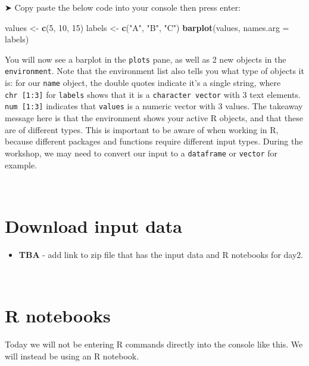 \documentclass[
]{book}
\newenvironment{Shaded}{\begin{snugshade}}{\end{snugshade}}
\newcommand{\AttributeTok}[1]{\textcolor[rgb]{0.13,0.29,0.53}{#1}}
\newcommand{\DecValTok}[1]{\textcolor[rgb]{0.00,0.00,0.81}{#1}}
\newcommand{\FunctionTok}[1]{\textcolor[rgb]{0.13,0.29,0.53}{\textbf{#1}}}
\newcommand{\NormalTok}[1]{#1}
\newcommand{\OtherTok}[1]{\textcolor[rgb]{0.56,0.35,0.01}{#1}}
\newcommand{\StringTok}[1]{\textcolor[rgb]{0.31,0.60,0.02}{#1}}
\providecommand{\tightlist}{%
  \setlength{\itemsep}{0pt}\setlength{\parskip}{0pt}}
\begin{document}
➤ Copy paste the below code into your console then press enter:

\begin{Shaded}
\begin{Highlighting}[]
\NormalTok{values }\OtherTok{\textless{}{-}} \FunctionTok{c}\NormalTok{(}\DecValTok{5}\NormalTok{, }\DecValTok{10}\NormalTok{, }\DecValTok{15}\NormalTok{)}
\NormalTok{labels }\OtherTok{\textless{}{-}} \FunctionTok{c}\NormalTok{(}\StringTok{"A"}\NormalTok{, }\StringTok{"B"}\NormalTok{, }\StringTok{"C"}\NormalTok{)}
\FunctionTok{barplot}\NormalTok{(values, }\AttributeTok{names.arg =}\NormalTok{ labels)}
\end{Highlighting}
\end{Shaded}

You will now see a barplot in the \texttt{plots} pane, as well as 2 new objects in the \texttt{environment}. Note that the environment list also tells you what type of objects it is: for our \texttt{name} object, the double quotes indicate it's a single string, where \texttt{chr\ {[}1:3{]}} for \texttt{labels} shows that it is a \texttt{character\ vector} with 3 text elements. \texttt{num\ {[}1:3{]}} indicates that \texttt{values} is a numeric vector with 3 values. The takeaway message here is that the environment shows your active R objects, and that these are of different types. This is important to be aware of when working in R, because different packages and functions require different input types. During the workshop, we may need to convert our input to a \texttt{dataframe} or \texttt{vector} for example.

~

\hypertarget{download-input-data}{%
\section{Download input data}\label{download-input-data}}

\begin{itemize}
\tightlist
\item
  \textbf{TBA} - add link to zip file that has the input data and R notebooks for day2.
\end{itemize}

~

\hypertarget{r-notebooks}{%
\section{R notebooks}\label{r-notebooks}}

Today we will not be entering R commands directly into the console like this. We will instead be using an R notebook.
\end{document}
